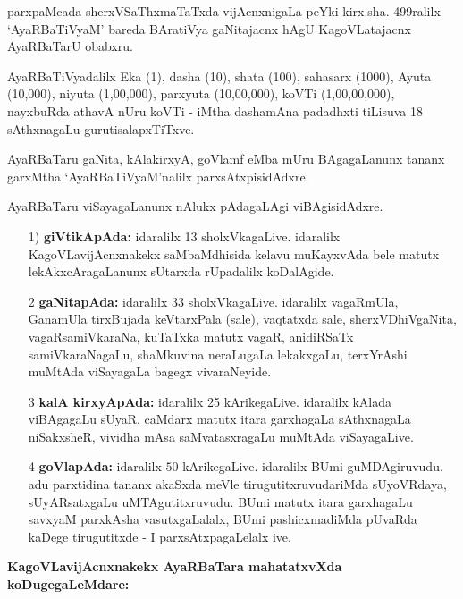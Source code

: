 parxpaMcada sherxVSaThxmaTaTxda vijAcnxnigaLa peYki kirx.sha. {\rm 499}ralilx `AyaRBaTiVyaM' bareda BAratiVya gaNitajacnx hAgU KagoVLatajacnx AyaRBaTarU obabxru.

AyaRBaTiVyadalilx Eka ({\rm 1}), dasha ({\rm 10}), shata ({\rm 100}), sahasarx ({\rm 1000}), Ayuta ({\rm 10,000}), niyuta ({\rm 1,00,000}), parxyuta ({\rm 10,00,000}), koVTi ({\rm 1,00,00,000}), nayxbuRda athavA nUru koVTi - iMtha dashamAna padadhxti tiLisuva {\rm 18} sAthxnagaLu gurutisalapxTiTxve.


AyaRBaTaru gaNita, kAlakirxyA, goVlamf eMba mUru BAgagaLanunx tananx garxMtha `AyaRBaTiVyaM'nalilx parxsAtxpisidAdxre.

AyaRBaTaru viSayagaLanunx nAlukx pAdagaLAgi viBAgisidAdxre.
\begin{itemize}
\item[{\rm 1)}] {\bf giVtikApAda:} idaralilx {\rm 13} sholxVkagaLive. idaralilx KagoVLavijAcnxnakekx saMbaMdhisida kelavu muKayxvAda bele matutx lekAkxcAragaLanunx sUtarxda rUpadalilx koDalAgide.

\item[{\rm 2}] {\bf gaNitapAda:} idaralilx {\rm 33} sholxVkagaLive. idaralilx vagaRmUla, GanamUla tirxBujada keVtarxPala (sale), vaqtatxda sale, sherxVDhiVgaNita, vagaRsamiVkaraNa, kuTaTxka matutx vagaR, anidiRSaTx samiVkaraNagaLu, shaMkuvina neraLugaLa lekakxgaLu, terxYrAshi muMtAda viSayagaLa bagegx vivaraNeyide. 
  
\item[{\rm 3}] {\bf kalA kirxyApAda:} idaralilx {\rm 25} kArikegaLive. idaralilx kAlada viBAgagaLu sUyaR, caMdarx matutx itara garxhagaLa sAthxnagaLa niSakxsheR, vividha mAsa saMvatasxragaLu muMtAda viSayagaLive.
 
\item[{\rm 4}] {\bf goVlapAda:} idaralilx $50$ kArikegaLive. idaralilx BUmi guMDAgiruvudu. adu parxtidina tananx akaSxda meVle tirugutitxruvudariMda sUyoVRdaya, sUyARsatxgaLu uMTAgutitxruvudu. BUmi matutx itara garxhagaLu savxyaM parxkAsha vasutxgaLalalx, BUmi pashicxmadiMda pUvaRda kaDege tirugutitxde - I parxsAtxpagaLelalx ive.
  \end{itemize}


\noindent
{\bf KagoVLavijAcnxnakekx AyaRBaTara mahatatxvXda koDugegaLeMdare:}

